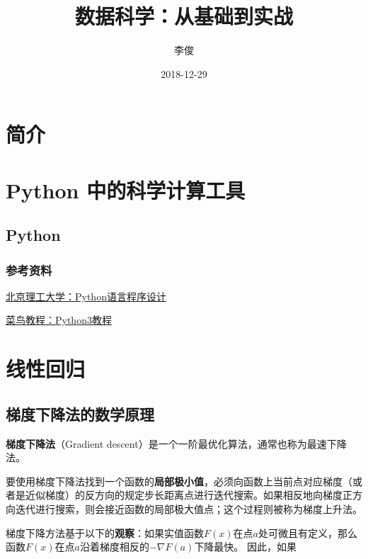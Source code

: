 \documentclass[]{book}
\title{数据科学：从基础到实战}
\author{李俊}
\date{2018-12-29}
\begin{document}
\maketitle

{
\setcounter{tocdepth}{1}
\tableofcontents
}
\hypertarget{section}{%
\chapter{简介}\label{section}}

\hypertarget{python-}{%
\chapter{Python 中的科学计算工具}\label{python-}}

\hypertarget{python}{%
\section{Python}\label{python}}

\hypertarget{section-1}{%
\subsection{参考资料}\label{section-1}}

\href{https://www.icourse163.org/course/BIT-268001?tid=1003243006}{北京理工大学：Python语言程序设计}

\href{http://www.runoob.com/python3/python3-tutorial.html}{菜鸟教程：Python3教程}

\hypertarget{section-2}{%
\chapter{线性回归}\label{section-2}}

\hypertarget{section-3}{%
\section{梯度下降法的数学原理}\label{section-3}}

\textbf{梯度下降法}（Gradient descent）是一个一阶最优化算法，通常也称为最速下降法。

要使用梯度下降法找到一个函数的\textbf{局部极小值}，必须向函数上当前点对应梯度（或者是近似梯度）的反方向的规定步长距离点进行迭代搜索。如果相反地向梯度正方向迭代进行搜索，则会接近函数的局部极大值点；这个过程则被称为梯度上升法。

梯度下降方法基于以下的\textbf{观察}：如果实值函数\(F(x)\)在点\(a\)处可微且有定义，那么函数\(F(x)\)在点\(a\)沿着梯度相反的\(- \nabla F(a)\)下降最快。
因此，如果
\end{document}
